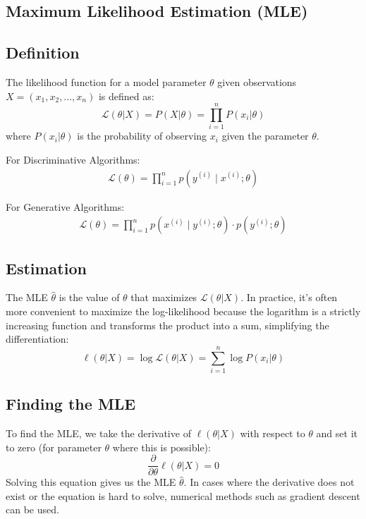 \documentclass[8pt, a4paper, landscape, includeheadfoot]{extarticle}
\begin{document}
\begin{multicols*}{4}
	\section{Maximum Likelihood Estimation (MLE)}

	\subsection{Definition}
	The likelihood function for a model parameter \(\theta\) given observations \(X = (x_1, x_2, ..., x_n)\) is defined as:
	\[
		\mathcal{L}(\theta | X) = P(X | \theta) = \prod_{i=1}^{n} P(x_i | \theta)
	\]
	where \(P(x_i | \theta)\) is the probability of observing \(x_i\) given the parameter \(\theta\).

	For Discriminative Algorithms:
	\begin{align*}
		\mathcal{L}(\theta) = \prod_{i=1}^{n} p(y^{(i)}\mid x^{(i)}; \theta)
	\end{align*}

	For Generative Algorithms:
	\begin{align*}
		\mathcal{L}(\theta) = \prod_{i=1}^{n} p(x^{(i)}\mid y^{(i)}; \theta)\cdot p(y^{(i)};\theta)
	\end{align*}
	\subsection{Estimation}
	The MLE \(\hat{\theta}\) is the value of \(\theta\) that maximizes \(\mathcal{L}(\theta | X)\). In practice, it's often more convenient to maximize the log-likelihood because the logarithm is a strictly increasing function and transforms the product into a sum, simplifying the differentiation:
	\[
		\ell(\theta | X) = \log \mathcal{L}(\theta | X) = \sum_{i=1}^{n} \log P(x_i | \theta)
	\]

	\subsection{Finding the MLE}
	To find the MLE, we take the derivative of \(\ell(\theta | X)\) with respect to \(\theta\) and set it to zero (for parameter \(\theta\) where this is possible):
	\[
		\frac{\partial}{\partial \theta} \ell(\theta | X) = 0
	\]
	Solving this equation gives us the MLE \(\hat{\theta}\). In cases where the derivative does not exist or the equation is hard to solve, numerical methods such as gradient descent can be used.


\end{multicols*}
\end{document}
